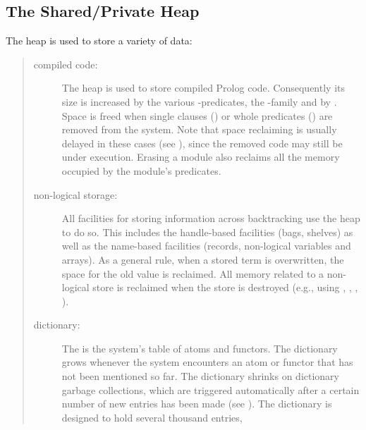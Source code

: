 \subsection{The Shared/Private Heap}
The heap is used to store a variety of data:
\begin{quote}
\begin{description}
\item [compiled code:]
The heap is used to store compiled Prolog code.
Consequently its size is increased by the various
-predicates,
the -family
and by .
Space is freed when single clauses
() or
whole predicates
() are
removed from the system.
Note that space reclaiming is usually delayed in these cases
(see ),
since the removed code may still be under execution.
Erasing a module also reclaims all the memory occupied by the module's
predicates.
\item [non-logical storage:]
All facilities for storing information across backtracking use the
heap to do so. This includes the handle-based facilities
(bags, shelves) as well as the name-based facilities (records, non-logical
variables and arrays).
As a general rule, when a stored term is overwritten, the space for
the old value is reclaimed. All memory related to a non-logical store is
reclaimed when the store is destroyed (e.g., using
,
,
,
).
\item [dictionary:]
The  is the system's table of atoms and functors.
The dictionary grows whenever the system encounters an atom or functor that
has not been mentioned so far.
The dictionary shrinks on dictionary garbage collections, which are triggered
automatically after a certain number of new entries has been made
(see ).
The dictionary is designed to hold several thousand entries,

\end{description}
\end{quote}
